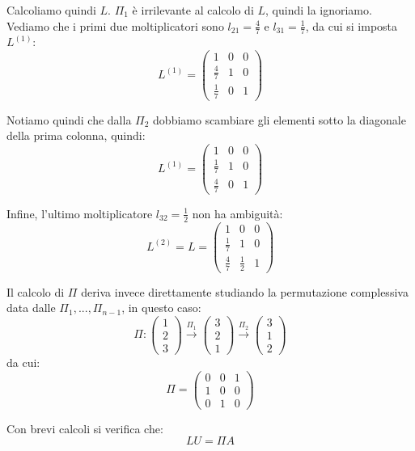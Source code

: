 \documentclass[a4paper,11pt]{article}
\begin{document}
Calcoliamo quindi $L$.
$\Pi_1$ è irrilevante al calcolo di $L$, quindi la ignoriamo.
Vediamo che i primi due moltiplicatori sono $l_{21} = \frac{4}{7}$ e $l_{31} = \frac{1}{7}$, da cui si imposta $L^{(1)}$:
$$
L^{(1)} = \begin{pmatrix}
	1 & 0 & 0 \\ 
	\frac{4}{7} & 1 & 0 \\ 
	\frac{1}{7} & 0 & 1
\end{pmatrix}
$$

Notiamo quindi che dalla $\Pi_2$ dobbiamo scambiare gli elementi sotto la diagonale della prima colonna, quindi:
$$
L^{(1)} = \begin{pmatrix}
	1 & 0 & 0 \\ 
	\frac{1}{7} & 1 & 0 \\ 
	\frac{4}{7} & 0 & 1
\end{pmatrix}
$$

Infine, l'ultimo moltiplicatore $l_{32} = \frac{1}{2}$ non ha ambiguità:
$$
L^{(2)} = L = \begin{pmatrix}
	1 & 0 & 0 \\ 
	\frac{1}{7} & 1 & 0 \\ 
	\frac{4}{7} & \frac{1}{2} & 1
\end{pmatrix}
$$

Il calcolo di $\Pi$ deriva invece direttamente studiando la permutazione complessiva data dalle $\Pi_1, ..., \Pi_{n - 1}$, in questo caso:
$$
\Pi : \begin{pmatrix}
	1 \\ 2 \\ 3
\end{pmatrix}
\xrightarrow{\Pi_1}
\begin{pmatrix}
	3 \\ 2 \\ 1
\end{pmatrix}
\xrightarrow{\Pi_2}
\begin{pmatrix}
	3 \\ 1 \\ 2
\end{pmatrix}
$$
da cui:
$$
\Pi = \begin{pmatrix}
	0 & 0 & 1 \\ 
	1 & 0 & 0 \\ 
	0 & 1 & 0
\end{pmatrix}
$$

Con brevi calcoli si verifica che:
$$
LU = \Pi A
$$

\par\medskip 
\end{document}
